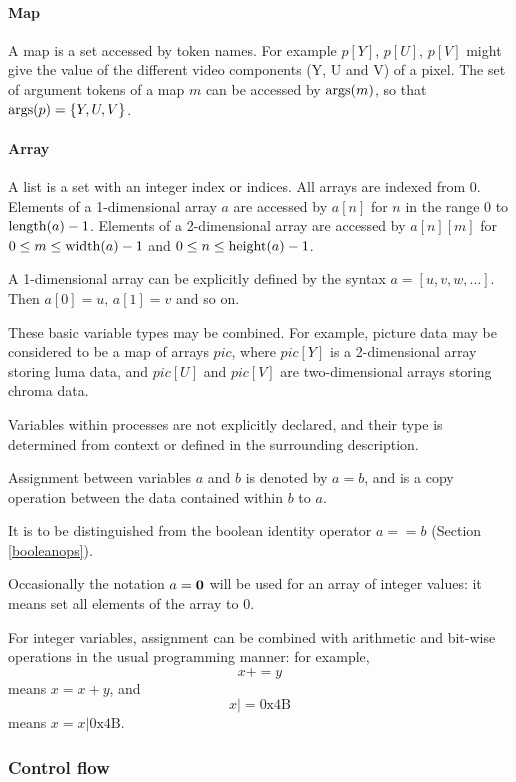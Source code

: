\paragraph*{Map}

A map is a set accessed by token names. For example
$p[Y]$, $p[U]$, $p[V]$ might give the value of the different video components
(Y, U and V) of a pixel. The set of argument tokens of a map $m$ can be accessed by $\operatorname{args}(m)$,
so that $\operatorname{args}(p)=\{Y,U,V\}$.

\paragraph*{Array} 

A list is a set with an integer index or indices. All arrays are indexed from 0. 
Elements of a 1-dimensional array $a$ are accessed by $a[n]$ for $n$ in the
range 0 to $\operatorname{length}(a)-1$. Elements of a 2-dimensional array are accessed by
$a[n][m]$ for $0\leq m\leq\operatorname{width}(a)-1$ and $0\leq n\leq\operatorname{height}(a)-1$.

A 1-dimensional array can be explicitly defined by the syntax $a=[u, v, w, \hdots]$.
Then $a[0]=u$, 
$a[1]=v$ and so on.

These basic variable types may be combined. For example, picture data may be considered
to be a map of arrays $pic$, where $pic[Y]$ is a 2-dimensional array storing luma data,
and $pic[U]$ and $pic[V]$ are two-dimensional arrays storing chroma data.

Variables within processes are not explicitly declared, and their type is determined from
context or defined in the surrounding description.

Assignment between variables $a$ and $b$ is denoted by $a=b$, and is a copy
operation between the data contained within $b$ to $a$. 

It is to be distinguished from
the boolean identity operator $a==b$ (Section \ref{booleanops}).

Occasionally the notation $a={\bf 0}$ will be used for an array of integer values:
it means set all elements of the array to 0.

For integer variables, assignment can be combined with arithmetic and bit-wise
operations in the usual programming manner: for example, 
\[x+=y\]
means $x=x+y$, and
\[x |= \text{0x4B}\]
means $x=x|\text{0x4B}$.

\subsubsection{Control flow}
\label{controlflow}

